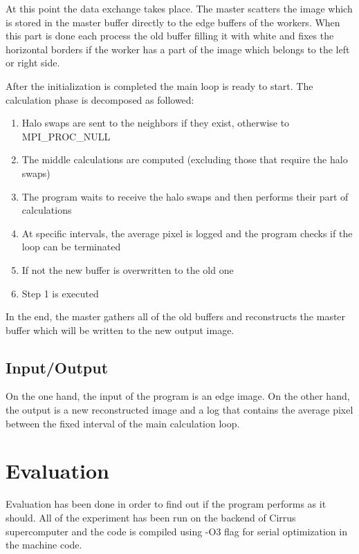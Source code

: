 \documentclass[12pt,a4paper]{article}
\newcommand{\sectionVspacing}{\vspace{15pt}}
\begin{document}
    At this point the data exchange takes place. The master scatters the image which is stored in the master buffer directly to the edge buffers of the workers. When this part is done each process the old buffer filling it with white and fixes the horizontal borders if the worker has a part of the image which belongs to the left or right side.

    After the initialization is completed the main loop is ready to start. The calculation phase is decomposed as followed:
    \begin{enumerate}
      \item Halo swaps are sent to the neighbors if they exist, otherwise to MPI\_PROC\_NULL
      \item The middle calculations are computed (excluding those that require the halo swaps)
      \item The program waits to receive the halo swaps and then performs their part of calculations
      \item At specific intervals, the average pixel is logged and the program checks if the loop can be terminated
      \item If not the new buffer is overwritten to the old one
      \item Step 1 is executed
    \end{enumerate}

    In the end, the master gathers all of the old buffers and reconstructs the master buffer which will be written to the new output image.

    \subsection{Input/Output}
    On the one hand, the input of the program is an edge image. On the other hand, the output is a new reconstructed image and a log that contains the average pixel between the fixed interval of the main calculation loop.

\sectionVspacing

\section{Evaluation}
    Evaluation has been done in order to find out if the program performs as it should. All of the experiment has been run on the backend of Cirrus supercomputer and the code is compiled using -O3 flag for serial optimization in the machine code.

\end{document}
